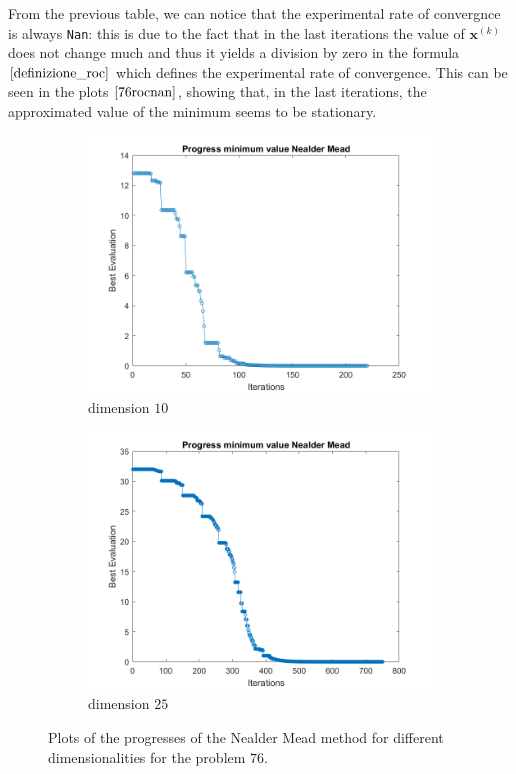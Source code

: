 From the previous table, we can notice that the experimental rate of convergnce is always \verb+Nan+: this is due to the fact that in the last iterations the value of $\mathbf{x}^{(k)}$ does not change much and thus it yields a division by zero in the formula $\eqref{definizione_roc}$ which defines the experimental rate of convergence.
This can be seen in the plots $\eqref{76rocnan}$, showing that, in the last iterations, the approximated value of the minimum seems to be stationary.
\begin{figure}[htbp]
    \centering
    \begin{subfigure}[t]{0.35\textwidth}  %
        \centering
        \includegraphics[width=\textwidth]{img/pb76_SX_es10.png}
        \caption{dimension $10$}
    \end{subfigure}
    \hspace{1cm} %
    \begin{subfigure}[t]{0.35\textwidth}
        \centering
        \includegraphics[width=\textwidth]{img/pb76_SX_es25.png}
        \caption{dimension $25$}
    \end{subfigure}
    \caption{ \small Plots of the progresses of the Nealder Mead method for different dimensionalities for the problem $76$.}
    \label{76rocnan}
\end{figure}


